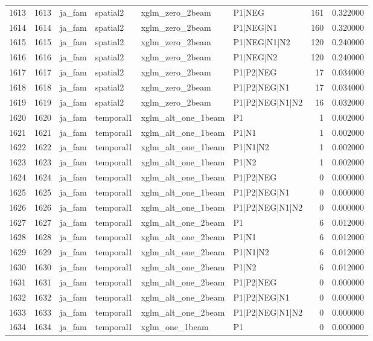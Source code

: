 \begin{tabular}{lrllllrr}
1613 & 1613 & ja_fam & spatial2 & xglm_zero_2beam & P1|NEG & 161 & 0.322000 \\
1614 & 1614 & ja_fam & spatial2 & xglm_zero_2beam & P1|NEG|N1 & 160 & 0.320000 \\
1615 & 1615 & ja_fam & spatial2 & xglm_zero_2beam & P1|NEG|N1|N2 & 120 & 0.240000 \\
1616 & 1616 & ja_fam & spatial2 & xglm_zero_2beam & P1|NEG|N2 & 120 & 0.240000 \\
1617 & 1617 & ja_fam & spatial2 & xglm_zero_2beam & P1|P2|NEG & 17 & 0.034000 \\
1618 & 1618 & ja_fam & spatial2 & xglm_zero_2beam & P1|P2|NEG|N1 & 17 & 0.034000 \\
1619 & 1619 & ja_fam & spatial2 & xglm_zero_2beam & P1|P2|NEG|N1|N2 & 16 & 0.032000 \\
1620 & 1620 & ja_fam & temporal1 & xglm_alt_one_1beam & P1 & 1 & 0.002000 \\
1621 & 1621 & ja_fam & temporal1 & xglm_alt_one_1beam & P1|N1 & 1 & 0.002000 \\
1622 & 1622 & ja_fam & temporal1 & xglm_alt_one_1beam & P1|N1|N2 & 1 & 0.002000 \\
1623 & 1623 & ja_fam & temporal1 & xglm_alt_one_1beam & P1|N2 & 1 & 0.002000 \\
1624 & 1624 & ja_fam & temporal1 & xglm_alt_one_1beam & P1|P2|NEG & 0 & 0.000000 \\
1625 & 1625 & ja_fam & temporal1 & xglm_alt_one_1beam & P1|P2|NEG|N1 & 0 & 0.000000 \\
1626 & 1626 & ja_fam & temporal1 & xglm_alt_one_1beam & P1|P2|NEG|N1|N2 & 0 & 0.000000 \\
1627 & 1627 & ja_fam & temporal1 & xglm_alt_one_2beam & P1 & 6 & 0.012000 \\
1628 & 1628 & ja_fam & temporal1 & xglm_alt_one_2beam & P1|N1 & 6 & 0.012000 \\
1629 & 1629 & ja_fam & temporal1 & xglm_alt_one_2beam & P1|N1|N2 & 6 & 0.012000 \\
1630 & 1630 & ja_fam & temporal1 & xglm_alt_one_2beam & P1|N2 & 6 & 0.012000 \\
1631 & 1631 & ja_fam & temporal1 & xglm_alt_one_2beam & P1|P2|NEG & 0 & 0.000000 \\
1632 & 1632 & ja_fam & temporal1 & xglm_alt_one_2beam & P1|P2|NEG|N1 & 0 & 0.000000 \\
1633 & 1633 & ja_fam & temporal1 & xglm_alt_one_2beam & P1|P2|NEG|N1|N2 & 0 & 0.000000 \\
1634 & 1634 & ja_fam & temporal1 & xglm_one_1beam & P1 & 0 & 0.000000 \\

\end{tabular}
